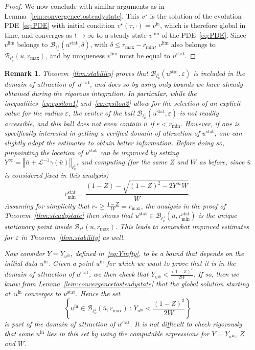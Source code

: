 \documentclass[10pt,a4paper]{article}
\theoremstyle{plain}
\newtheorem{remark}[theorem]{Remark}
\newcommand{\B}{\mathcal{B}}
\renewcommand{\B}{\mathcal{B}}
\renewcommand{\L}{\mathcal{L}}
\newcommand{\bu}{\bar{u}}
\newcommand{\1}{\mathbf{1}}
\newcommand{\rstar}{r_*}
\newcommand{\uin}{{u^{\mathrm{in}}}}
\newcommand{\vin}{{v^{\mathrm{in}}}}
\newcommand{\stat}{\mathrm{stat}}
\begin{document}
\begin{proof}
We now conclude with similar arguments as in Lemma~\ref{lem:convergencetosteadystate}. This $v^\star$ is the solution of the evolution PDE~\eqref{eq:PDE} with initial condition $v^\star(\tau,\cdot) = \vin$, which is therefore global in time, and converges as $t\to\infty$ to a steady state $v^{\lim}$ of the PDE~\eqref{eq:PDE}. Since $v^{\lim}$ belongs to $\B_{\ell^1_\nu}(u^\stat,\delta)$, with $\delta\leq r_{\max}-r_{\min}$, $v^{\lim}$ also belongs to $\B_{\ell^1_\nu}(\bu,r_{\max})$, and by uniqueness $v^{\lim}$ must be equal to $u^\stat$.
\end{proof}

\begin{remark}
Theorem~\ref{thm:stability} proves that $\B_{\ell^1_\nu}(u^\stat,\varepsilon)$ is included in the domain of attraction of~$u^\stat$, and does so by using only bounds we have already obtained during the rigorous integration. 
In particular, while the inequalities~\eqref{eq:epsilon1} and~\eqref{eq:epsilon2} allow for the selection of an explicit value for the radius $\varepsilon$, the center of the ball $\B_{\ell^1_\nu}(u^\stat,\varepsilon)$ is not readily accessible, and this ball does not even contain $\bu$ if $\varepsilon<r_{\min}$. 
However, if one is specifically interested in getting a verified domain of attraction of $u^\stat$, one can slightly adapt the estimates to obtain better information.
Before doing so, pinpointing the location of $u^\stat$ can be improved by setting $Y^\infty =   \left\Vert \bu + \L^{-1}\gamma(\bu)  \right\Vert_{\ell^1_\nu}$, and computing (for the same $Z$ and $W$ as before, since $\bu$ is considered fixed in this analysis)
\[
  r_{\min}^\stat = \frac{(1-Z)-\sqrt{(1-Z)^2-2Y^\infty W}}{W}.
\]
Assuming for simplicity that $\rstar \geq \frac{1-Z}{W} = r_{\max}$, the analysis 
in the proof of Theorem~\ref{thm:steadystate} then shows that $u^\stat \in 
\B_{\ell^1_\nu}(\bu,r_{\min}^\stat)$ is the unique stationary point inside 
$\B_{\ell^1_\nu}(\bu,r_{\max})$. This leads to somewhat improved estimates for $\varepsilon$ in Theorem~\ref{thm:stability} as well. 

Now consider $Y=Y_\uin$, defined in~\eqref{eq:Yinfty}, to be a bound that depends on the initial data $\uin$. Given a point $\uin$ for which we want to prove that it is in the domain of attraction of $u^\stat$, we then check that 
$Y_\uin < \frac{(1-Z)^2}{2W}$. If so, then we know from  Lemma~\ref{lem:convergencetosteadystate} that the global solution starting at~$\uin$ converges to $u^\stat$. Hence the set
\[
  \left\{ \uin \in \B_{\ell^1_\nu}(\bu,r_{\max}) \, : \, 
  Y_\uin < \frac{(1-Z)^2}{2W} \right\}
\]
is part of the domain of attraction of $u^\stat$. It is not difficult to check rigorously that some $\uin$ lies in this set by using the computable expressions for $Y=Y_\uin$, $Z$ and $W$. 
\end{remark}
\end{document}
